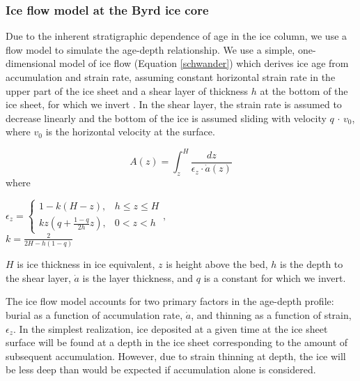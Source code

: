 \subsubsection{Ice flow model at the Byrd ice core}

Due to the inherent stratigraphic dependence of age in the ice column, we use a flow model to simulate the age-depth relationship. We use a simple, one-dimensional model of ice flow (Equation \ref{schwander}) which derives ice age from accumulation and strain rate, assuming constant horizontal strain rate in the upper part of the ice sheet and a shear layer of thickness $h$ at the bottom of the ice sheet, for which we invert \citep{schwander2001}. In the shear layer, the strain rate is assumed to decrease linearly and the bottom of the ice is assumed sliding with velocity $q$ $\cdot$ $v_0$, where $v_0$ is the horizontal velocity at the surface.

\begin{equation}\label{schwander}
A(z) = \int_{z}^{H} \frac{dz}{\epsilon_z \cdot \dot{a}(z)}
\end{equation}
where
\begin{center}
$    \epsilon_z=
    \begin{cases}
                 1-k(H-z), & h \leq z \leq H \\
                  kz(q+\frac{1-q}{2h}z), & 0 < z < h
    \end{cases}, 
$
\\
$
k = \frac{2}{2H - h(1-q)}
$
\end{center}
$H$ is ice thickness in ice equivalent, $z$ is height above the bed, $h$ is the depth to the shear layer, $\dot{a}$ is the layer thickness, and $q$ is a constant for which we invert. 

The ice flow model accounts for two primary factors in the age-depth profile: burial as a function of accumulation rate, $\dot{a}$, and thinning as a function of strain, $\epsilon_z$. In the simplest realization, ice deposited at a given time at the ice sheet surface will be found at a depth in the ice sheet corresponding to the amount of subsequent accumulation. However, due to strain thinning at depth, the ice will be less deep than would be expected if accumulation alone is considered. 

